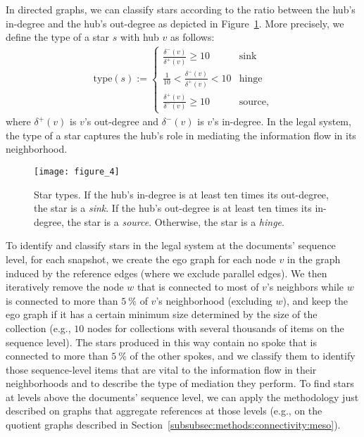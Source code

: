 In directed graphs, we can classify stars according to the ratio between the hub's in-degree and the hub's out-degree as depicted in Figure~\ref{fig:star-types}.
More precisely, we define the type of a star $s$ with hub $v$ as follows:
\begin{align*}
	\text{type}(s) := \begin{cases}
		\frac{\delta^-(v)}{\delta^+(v)} \geq 10&\text{sink}\\
		\frac{1}{10} < \frac{\delta^-(v)}{\delta^+(v)} < 10&\text{hinge}\\
		\frac{\delta^+(v)}{\delta^-(v)} \geq 10&\text{source},
	\end{cases}
\end{align*}
where $\delta^+(v)$ is $v$'s out-degree and $\delta^-(v)$ is $v$'s in-degree.
In the legal system, the type of a star captures the hub's role in mediating the information flow in its neighborhood.

\begin{figure}
	\centering
	\texttt{[image: figure\_4]}
	\caption{Star types. 
	If the hub's in-degree is at least ten times its out-degree, the star is a \emph{sink}. 
	If the hub's out-degree is at least ten times its in-degree, the star is a \emph{source}. 
	Otherwise, the star is a \emph{hinge}.}\label{fig:star-types}
\end{figure}

To identify and classify stars in the legal system at the documents' sequence level,
for each snapshot, we create the ego graph for each node $v$ in the graph induced by the reference edges (where we exclude parallel edges). 
We then iteratively remove the node $w$ that is connected to most of $v$'s neighbors while $w$ is connected to more than $5~\%$ of $v$'s neighborhood (excluding $w$), and keep the ego graph if it has a certain minimum size determined by the size of the collection (e.g., $10$ nodes for collections with several thousands of items on the sequence level).
The stars produced in this way contain no spoke that is connected to more than $5~\%$ of the other spokes, and we classify them to identify those sequence-level items that are vital to the information flow in their neighborhoods and to describe the type of mediation they perform.
To find stars at levels above the documents' sequence level, we can apply the methodology just described on graphs that aggregate references at those levels (e.g., on the quotient graphs described in Section~\ref{subsubsec:methods:connectivity:meso}).

\vspace*{12pt}
